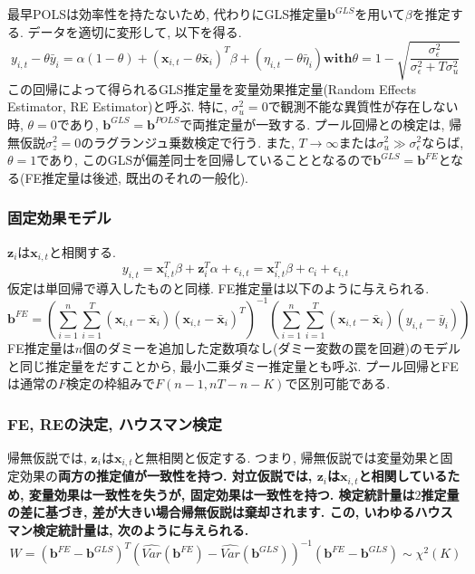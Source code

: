 \documentclass[paper=a4paper,fontsize=10pt]{jlreq}
\begin{document}
最早POLSは効率性を持たないため, 代わりにGLS推定量$\mathbf{b}^{GLS}$を用いて$\beta$を推定する. データを適切に変形して, 以下を得る.
\begin{equation*}
  y_{i,t} - \theta\bar{y}_{i}= \alpha(1-\theta) + (\mathbf{x}_{i,t} - \theta\bar{\mathbf{x}}_{i})^T \beta + (\eta_{i,t} - \theta\bar{\eta}_{i})　\mathbf{with}　\theta = 1 - \sqrt{\frac{\sigma_\epsilon^2}{\sigma_\epsilon^2 + T \sigma_u^2}}
\end{equation*}
この回帰によって得られるGLS推定量を変量効果推定量(Random Effects Estimator, RE Estimator)と呼ぶ. 特に, $\sigma_u^2 = 0$で観測不能な異質性が存在しない時, $\theta = 0$であり, $\mathbf{b}^{GLS} = \mathbf{b}^{POLS}$で両推定量が一致する. プール回帰との検定は, 帰無仮説$\sigma_z^2=0$のラグランジュ乗数検定で行う. また, $T \to \infty$または$\sigma_u^2 \gg \sigma_\epsilon^2$ならば, $\theta = 1$であり, このGLSが偏差同士を回帰していることとなるので$\mathbf{b}^{GLS} = \mathbf{b}^{FE}$となる(FE推定量は後述, 既出のそれの一般化).

\subsubsection{固定効果モデル}
$\mathbf{z}_i$は$\mathbf{x}_{i,t}$と相関する. 
\begin{equation*}
  y_{i,t} = \mathbf{x}_{i,t}^T \beta + \mathbf{z}_{i}^T \alpha + \epsilon_{i,t} = \mathbf{x}_{i,t}^T \beta + c_i + \epsilon_{i,t}
\end{equation*}
仮定は単回帰で導入したものと同様. FE推定量は以下のように与えられる.
\begin{equation*}
  \mathbf{b}^{FE} = (\sum_{i=1}^{n}\sum_{i=1}^{T}(\mathbf{x}_{i,t} - \bar{\mathbf{x}}_i)(\mathbf{x}_{i,t} - \bar{\mathbf{x}}_i)^T)^{-1} (\sum_{i=1}^{n}\sum_{i=1}^{T}(\mathbf{x}_{i,t} - \bar{\mathbf{x}}_i)(y_{i,t} - \bar{y}_i))
\end{equation*}
FE推定量は$n$個のダミーを追加した定数項なし(ダミー変数の罠を回避)のモデルと同じ推定量をだすことから, 最小二乗ダミー推定量とも呼ぶ. プール回帰とFEは通常の$F$検定の枠組みで$F(n - 1, nT - n - K)$で区別可能である.

\subsubsection{FE, REの決定, ハウスマン検定}
帰無仮説では, $\mathbf{z}_i$は$\mathbf{x}_{i,t}$と無相関と仮定する. つまり, 帰無仮説では変量効果と固定効果の\rmfamily\mcfamily\bfseries{両方の推定値が一致性を持つ}\mdseries . 対立仮説では, $\mathbf{z}_i$は$\mathbf{x}_{i,t}$と相関しているため, 変量効果は一致性を失うが, 固定効果は一致性を持つ. 検定統計量は$2$推定量の差に基づき, 差が大きい場合帰無仮説は棄却されます. この, いわゆるハウスマン検定統計量は, 次のように与えられる.
\begin{equation*}
  W = (\mathbf{b}^{FE} - \mathbf{b}^{GLS})^T(\hat{Var}(\mathbf{b}^{FE}) - \hat{Var}(\mathbf{b}^{GLS}))^{-1} (\mathbf{b}^{FE} - \mathbf{b}^{GLS}) \sim \chi^2(K)
\end{equation*}
\end{document}

